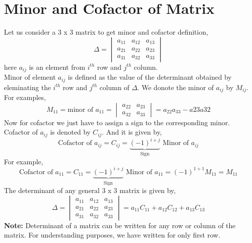 \documentclass{article}
\begin{document}
\section{Minor and Cofactor of Matrix}
Let us consider a 3 x 3 matrix to get minor and cofactor definition,
\begin{equation*}
    \Delta=
    \begin{vmatrix}
        a_{11} & a_{12} & a_{13} \\
        a_{21} & a_{22} & a_{23} \\
        a_{31} & a_{32} & a_{33} 
    \end{vmatrix}
\end{equation*}
here $a_{ij}$ is an element from $i^{th}$ row and $j^{th}$ column.\\
Minor of element $a_{ij}$ is defined as the value of the determinant obtained by eleminating the $i^{th}$ row and $j^{th}$ column of $\Delta$. We donote the minor of $a_{ij}$ by $M_{ij}$. For examples,
\begin{equation*}
    M_{11}=\text{minor of } a_{11} =
    \begin{vmatrix}
        a_{22} & a_{23}\\
        a_{32} & a_{33}
    \end{vmatrix}
    = a_{22}a_{33}-a{23}a{32}
\end{equation*}
Now for cofactor we just have to assign a sign to the corresponding minor. Cofactor of $a_{ij}$ is denoted by $C_{ij}$. And it is given by,
\begin{equation*}
    \text{Cofactor of } a_{ij}=C_{ij}=\underbrace{(-1)^{i+j}}_{\text{Sign}} \text{ Minor of } a_{ij}
\end{equation*}
For example,
\begin{equation*}
    \text{Cofactor of } a_{11}=C_{11}=\underbrace{(-1)^{i+j}}_{\text{Sign}} \text{ Minor of } a_{11}=(-1)^{1+1}M_{11}=M_{11}
\end{equation*}
The determinant of any general 3 x 3 matrix is given by,
\begin{equation*}
    \Delta=
    \begin{vmatrix}
        a_{11} & a_{12} & a_{13} \\
        a_{21} & a_{22} & a_{23} \\
        a_{31} & a_{32} & a_{33} 
    \end{vmatrix}
    =a_{11}C_{11}+a_{12}C_{12}+a_{13}C_{13}
\end{equation*}
\textbf{Note:} Determinant of a matrix can be written for any row or column of the matrix. For understanding purposes, we have written for only first row.
\end{document}
